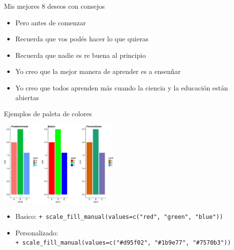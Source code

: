 \documentclass[ignorenonframetext,]{beamer}
\providecommand{\tightlist}{%
  \setlength{\itemsep}{0pt}\setlength{\parskip}{0pt}}
\begin{document}
\begin{frame}{Mis mejores 8 deseos con consejos}

\begin{itemize}[<+->]
\tightlist
\item
  Pero antes de comenzar
\item
  Recuerda que vos podés hacer lo que quieras
\item
  Recuerda que nadie es re buena al principio
\item
  Yo creo que la mejor manera de aprender es a ensenñar
\item
  Yo creo que todos aprenden más cuando la ciencia y la educación están
  abiertas
\end{itemize}

\end{frame}


\begin{frame}[fragile]{Ejemplos de paleta de colores}

\includegraphics[width=225px]{../figures/talk/ejemplo-1}

\begin{itemize}
\tightlist
\item
  Basico:
  \texttt{+\ scale\_fill\_manual(values=c("red",\ "green",\ "blue"))}
\item
  Personalizado:
  \texttt{+\ scale\_fill\_manual(values=c("\#d95f02",\ "\#1b9e77",\ "\#7570b3"))}
\end{itemize}

\end{frame}
\end{document}
